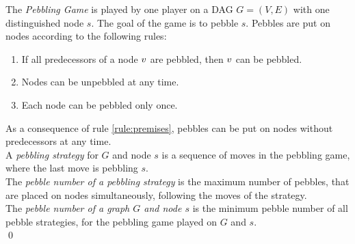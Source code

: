 \documentclass{llncs}
\begin{document}
\begin{definition}
\label{def:pebbling-game}
The \emph{Pebbling Game} is played by one player on a DAG $G = (V,E)$ with one distinguished node $s$.
The goal of the game is to pebble $s$. Pebbles are put on nodes according to the following rules:
\begin{enumerate}
	\item \label{rule:premises} If all predecessors of a node $v$ are pebbled, then $v$ can be pebbled.
	\item Nodes can be unpebbled at any time.
	\item \label{rule:onlyonce} Each node can be pebbled only once.
\end{enumerate}
As a consequence of rule \ref{rule:premises}, pebbles can be put on nodes without predecessors at any time.\\
A \emph{pebbling strategy} for $G$ and node $s$ is a sequence of moves in the pebbling game, where the last move is pebbling $s$.\\
The \emph{pebble number of a pebbling strategy} is the maximum number of pebbles, that are placed on nodes simultaneously, following the moves of the strategy.\\
The \emph{pebble number of a graph $G$ and node $s$} is the minimum pebble number of all pebble strategies, for the pebbling game played on $G$ and $s$.\\
\qed
\end{definition}
\end{document}
